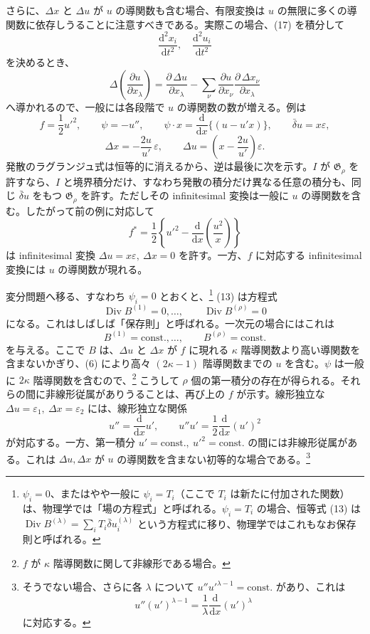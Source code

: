 \documentclass[11pt]{article}
\newcommand{\D}{\Delta}
\newcommand{\eps}{\varepsilon}
\providecommand{\dd}{\mathrm d}
\providecommand{\Div}{\operatorname{Div}}
\providecommand{\G}{\mathfrak G}
\providecommand{\bd}{\bar{\delta}}
\providecommand{\p}{\partial}
\begin{document}
さらに、\(\D x\) と \(\D u\) が \(u\) の導関数も含む場合、有限変換は \(u\) の無限に多くの導関数に依存しうることに注意すべきである。実際この場合、(17) を積分して
\[
\frac{\dd^2x_i}{\dd t^2},\quad \frac{\dd^2u_i}{\dd t^2}
\]
を決めるとき、
\[
\D\!\left(\frac{\p u}{\p x_\lambda}\right)
=\frac{\p\,\D u}{\p x_\lambda}
-\sum_\nu\frac{\p u}{\p x_\nu}
\frac{\p\,\D x_\nu}{\p x_\lambda}
\]
へ導かれるので、一般には各段階で \(u\) の導関数の数が増える。例は
\[
f=\frac12 u'^2,\qquad
\psi=-u'',\qquad
\psi\cdot x=\frac{\dd}{\dd x}\{(u-u'x)\},\qquad
\bd u=x\eps,
\]
\[
\D x=-\frac{2u}{u'}\,\eps,\qquad
\D u=\left(x-\frac{2u}{u'}\right)\eps.
\]
発散のラグランジュ式は恒等的に消えるから、逆は最後に次を示す。\(I\) が \(\G_\rho\) を許すなら、\(I\) と境界積分だけ、すなわち発散の積分だけ異なる任意の積分も、同じ \(\bd u\) をもつ \(\G_\rho\) を許す。ただしその infinitesimal 変換は一般に \(u\) の導関数を含む。したがって前の例に対応して
\[
f^*=\frac12\left\{u'^2-\frac{\dd}{\dd x}\left(\frac{u^2}{x}\right)\right\}
\]
は infinitesimal 変換 \(\D u=x\eps,\ \D x=0\) を許す。一方、\(f\) に対応する infinitesimal 変換には \(u\) の導関数が現れる。

変分問題へ移る、すなわち \(\psi_i=0\) とおくと、\footnote{\(\psi_i=0\)、またはやや一般に \(\psi_i=T_i\)（ここで \(T_i\) は新たに付加された関数）は、物理学では「場の方程式」と呼ばれる。\(\psi_i=T_i\) の場合、恒等式 (13) は \(\Div B^{(\lambda)}=\sum_i T_i\bd u_i^{(\lambda)}\) という方程式に移り、物理学ではこれもなお保存則と呼ばれる。} (13) は方程式
\[
\Div B^{(1)}=0,\ldots,\qquad \Div B^{(\rho)}=0
\]
になる。これはしばしば「保存則」と呼ばれる。一次元の場合にはこれは
\[
B^{(1)}=\mathrm{const.},\ldots,\qquad B^{(\rho)}=\mathrm{const.}
\]
を与える。ここで \(B\) は、\(\D u\) と \(\D x\) が \(f\) に現れる \(\kappa\) 階導関数より高い導関数を含まないかぎり、(6) により高々 \((2\kappa-1)\) 階導関数までの \(u\) を含む。\(\psi\) は一般に \(2\kappa\) 階導関数を含むので、\footnote{\(f\) が \(\kappa\) 階導関数に関して非線形である場合。} こうして \(\rho\) 個の第一積分の存在が得られる。それらの間に非線形従属がありうることは、再び上の \(f\) が示す。線形独立な \(\D u=\eps_1,\ \D x=\eps_2\) には、線形独立な関係
\[
u''=\frac{\dd}{\dd x}u',\qquad
u''u'=\frac12\frac{\dd}{\dd x}(u')^2
\]
が対応する。一方、第一積分 \(u'=\mathrm{const.},\ u'^2=\mathrm{const.}\) の間には非線形従属がある。これは \(\D u,\D x\) が \(u\) の導関数を含まない初等的な場合である。\footnote{そうでない場合、さらに各 \(\lambda\) について \(u''u'^{\lambda-1}=\mathrm{const.}\) があり、これは
\[
u''(u')^{\lambda-1}=\frac1\lambda\frac{\dd}{\dd x}(u')^\lambda
\]
に対応する。}
\end{document}
